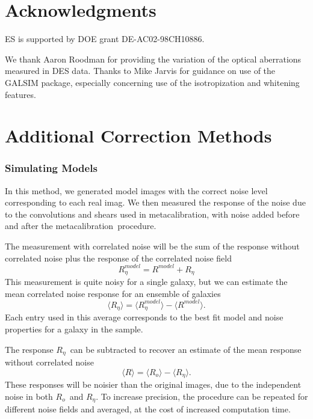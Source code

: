 \documentclass[usegraphicx,usenatbib]{mn2e}
\newcommand{\mcal}{metacalibration}
\newcommand{\mcalR}{$R$}
\newcommand{\mcalRo}{$R_o$}
\newcommand{\mcalRnoise}{$R_\eta$}
\newcommand{\mcalRmodel}{$R^{model}$}
\newcommand{\mcalRnoisemodel}{$R^{model}_\eta$}
\begin{document}
\section*{Acknowledgments}

ES is supported by DOE grant DE-AC02-98CH10886.

We thank Aaron Roodman for providing the variation of the optical aberrations
measured in DES data.  Thanks to Mike Jarvis for guidance on use of the GALSIM
package, especially concerning use of the isotropization and whitening features.


\appendix

\section{Additional Correction Methods}

\subsubsection{Simulating Models}

In this method, we generated model images with the correct noise level corresponding
to each real imag.  We then measured the response of the noise due to the
convolutions and shears used in \mcal, with noise added before and
after the \mcal\ procedure.

The measurement with correlated noise will be the sum of the response
without correlated noise plus the response of the correlated noise field
\begin{equation}
    \mbox{\mcalRnoisemodel} = \mbox{\mcalRmodel} + \mbox{\mcalRnoise}
\end{equation}
This measurement is quite noisy for a single galaxy, but we
can estimate the mean correlated noise response for an ensemble
of galaxies
\begin{equation}
    \langle \mbox{\mcalRnoise} \rangle = \langle \mbox{\mcalRnoisemodel} \rangle - \langle \mbox{\mcalRmodel} \rangle.
\end{equation}
Each entry used in this average corresponds to the best fit model
and noise properties for a galaxy in the sample.

The response \mcalRnoise\ can be subtracted to recover an estimate of the mean
response without correlated noise
\begin{equation}
    \langle \mbox{\mcalR} \rangle = \langle \mbox{\mcalRo} \rangle - \langle \mbox{\mcalRnoise} \rangle.
\end{equation}
These responses will be noisier than the original images, due to the
independent noise in both \mcalRo\ and \mcalRnoise.  To increase
precision, the procedure can be repeated for different noise fields
and averaged, at the cost of increased computation time.




\end{document}
